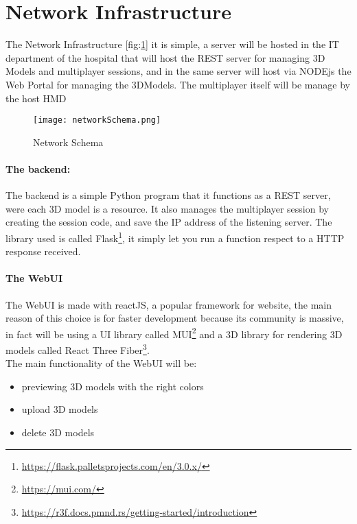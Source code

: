 \section{Network Infrastructure}
\noindent
The Network Infrastructure [fig:\ref{fig:NetworkSchema}] it is simple, a server will be hosted in the IT department of the hospital that will host the \ac{REST} server for managing 3D Models and multiplayer sessions,
and in the same server will host via NODEjs the Web Portal for managing the 3DModels.
The multiplayer itself will be manage by the host \ac{HMD}

\begin{figure}[h]
  \centering
  \texttt{[image: networkSchema.png]}
  \caption{Network Schema}
  \label{fig:NetworkSchema}
\end{figure}


\paragraph{The backend:}
The backend is a simple Python program that it functions as a \ac{REST} server, were each 3D model is a resource.
It also manages the multiplayer session by creating the session code, and save the \ac{IP} address of the listening server.
The library used is called Flask\footnote{\url{https://flask.palletsprojects.com/en/3.0.x/}}, it simply let you run a function respect to a \ac{HTTP} response received.

\paragraph{The WebUI}
The WebUI is made with reactJS, a popular framework for website, the main reason of this choice is for faster development because its community is massive, in fact will be using a UI library called MUI\footnote{\url{https://mui.com/}}
and a 3D library for rendering 3D models called React Three Fiber\footnote{\url{https://r3f.docs.pmnd.rs/getting-started/introduction}}.\\
The main functionality of the WebUI will be:
\begin{itemize}
  \item previewing 3D models with the right colors 
  \item upload 3D models
  \item delete 3D models
\end{itemize}



